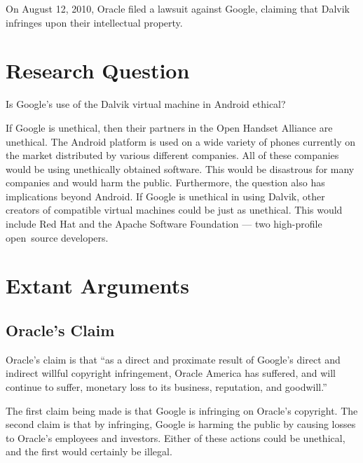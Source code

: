 \documentclass[11pt]{article}
\begin{document}
\begin{multicols}{2}
On August 12, 2010, Oracle filed a lawsuit against Google, claiming that Dalvik
infringes upon their intellectual property. \cite[Count VIII]{oracle-lawsuit}


\section{Research Question} %
\label{sec:question}

Is Google's use of the Dalvik virtual machine in Android ethical?

If Google is unethical, then their partners in the Open Handset Alliance are
unethical.  The Android platform is used on a wide variety of phones currently
on the market distributed by various different companies.  All of these
companies would be using unethically obtained software.  This would be
disastrous for many companies and would harm the public.  Furthermore, the
question also has implications beyond Android.  If Google is unethical in using
Dalvik, other creators of compatible virtual machines could be just as
unethical.  This would include Red Hat and the Apache Software Foundation ---
two high-profile open~source developers.


\section{Extant Arguments} %
\label{sec:args}

\subsection{Oracle's Claim} %
\label{sub:args_oracle}

Oracle's claim is that ``as a direct and proximate result of Google's direct
and indirect willful copyright infringement, Oracle America has suffered, and
will continue to suffer, monetary loss to its business, reputation, and
goodwill.'' \cite[p.~9 line 11]{oracle-lawsuit}

The first claim being made is that Google is infringing on Oracle's copyright.
The second claim is that by infringing, Google is harming the public by causing
losses to Oracle's employees and investors.  Either of these actions could be
unethical, and the first would certainly be illegal.



\end{multicols}
\end{document}
